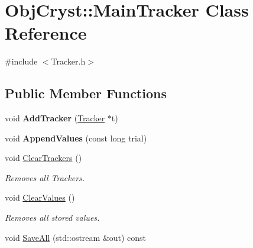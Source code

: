 \hypertarget{class_obj_cryst_1_1_main_tracker}{}\section{Obj\+Cryst\+::Main\+Tracker Class Reference}
\label{class_obj_cryst_1_1_main_tracker}


{\ttfamily \#include $<$Tracker.\+h$>$}

\subsection*{Public Member Functions}
\begin{DoxyCompactItemize}
\item 
\mbox{\label{class_obj_cryst_1_1_main_tracker_a57cc485e6071733b882ff451d0e4b0c2}} 
void {\bfseries Add\+Tracker} (\mbox{\hyperlink{class_obj_cryst_1_1_tracker}{Tracker}} $\ast$t)
\item 
\mbox{\label{class_obj_cryst_1_1_main_tracker_a364936085e098d0db6241e1ea618e8ad}} 
void {\bfseries Append\+Values} (const long trial)
\item 
\mbox{\label{class_obj_cryst_1_1_main_tracker_a90300f3395141e9245483f0fef1bba33}} 
void \mbox{\hyperlink{class_obj_cryst_1_1_main_tracker_a90300f3395141e9245483f0fef1bba33}{Clear\+Trackers}} ()
\begin{DoxyCompactList}\small\item\em Removes all Trackers. \end{DoxyCompactList}\item 
\mbox{\label{class_obj_cryst_1_1_main_tracker_aa641363dfd39e038e091979911d001a8}} 
void \mbox{\hyperlink{class_obj_cryst_1_1_main_tracker_aa641363dfd39e038e091979911d001a8}{Clear\+Values}} ()
\begin{DoxyCompactList}\small\item\em Removes all stored values. \end{DoxyCompactList}\item 
void \mbox{\hyperlink{class_obj_cryst_1_1_main_tracker_a1bbb24cd3ff9eb57aca89f8b2c64b68b}{Save\+All}} (std\+::ostream \&out) const
\item 
\mbox{\label{class_obj_cryst_1_1_main_tracker_aa12b3027a09b8cb29fb43ba94c884f81}} 

\end{DoxyCompactItemize}
